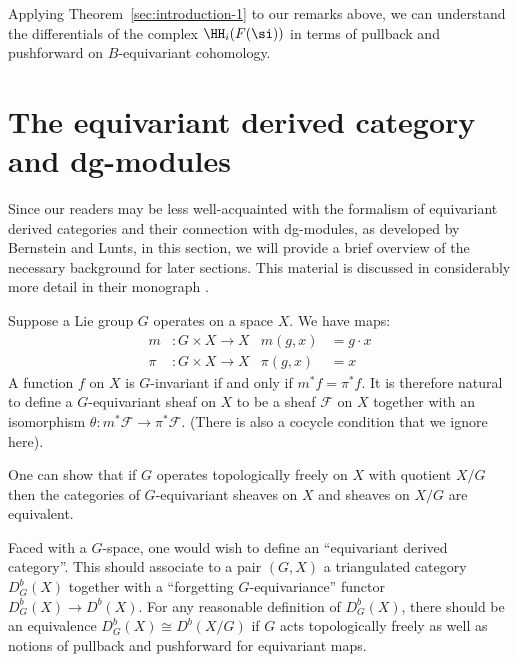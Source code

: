 \documentclass[12pt]{wart}
\theoremstyle{remark}
\begin{document}
Applying Theorem~\ref{sec:introduction-1} to our remarks above, we can understand the differentials of the complex $\HH_i(F( \si))$ in terms of pullback and pushforward on $B$-equivariant cohomology.

\section{The equivariant derived category and dg-modules}
\label{sec:equi-derived-cat}

Since our readers may be less well-acquainted with the formalism of
equivariant derived categories and their connection with dg-modules,
as developed by Bernstein and Lunts, in this section, we will provide
a brief overview of the necessary background for later sections.  This
material is discussed in considerably more detail in their monograph
\cite{BL}.


Suppose a Lie group $G$ operates on a space $X$. We have maps:
\begin{align*}
m &\colon G \times X \to X & m(g,x) &= g\cdot x \\
\pi &\colon G \times X \to X & \pi(g,x) &=x
\end{align*}
A function $f$ on $X$ is $G$-invariant if and only if $m^*f =
\pi^*f$. It is therefore natural
to define a $G$-equivariant sheaf on $X$ to be a sheaf $\mathcal{F}$
on $X$ together with an isomorphism $\theta : m^*\mathcal{F} \to
\pi^*\mathcal{F}$. (There is also a cocycle condition that we ignore here).

One can show that if $G$ operates topologically
freely on $X$ with quotient $X / G$ then the categories of
$G$-equivariant sheaves on $X$ and sheaves on $X/G$ are equivalent.

Faced with a $G$-space, one would wish to define an ``equivariant derived category''. This should
associate to a pair $(G,X)$ a triangulated category $D^b_G(X)$ together
with a ``forgetting $G$-equivariance'' functor $D^b_G(X) \to D^b(X)$. For
any reasonable definition of $D^b_G(X)$, there should be an equivalence
$D^b_G(X) \cong D^b(X/G)$ if $G$ acts topologically freely as well as 
notions of pullback and pushforward for equivariant maps.
\end{document}
